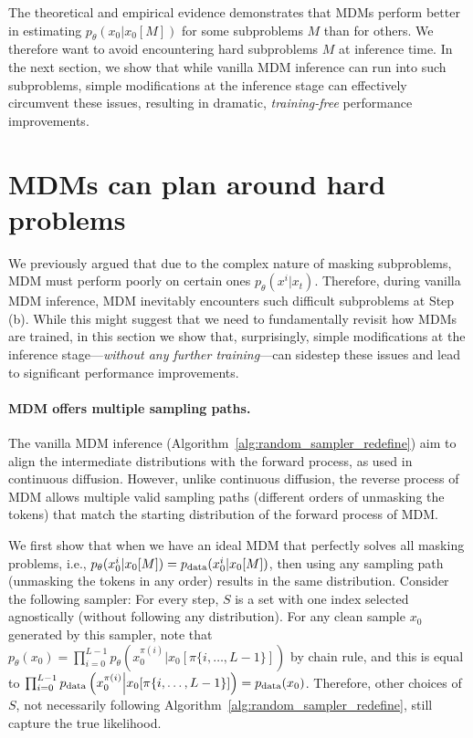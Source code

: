 \documentclass{article}
\theoremstyle{plain}
\theoremstyle{definition}
\theoremstyle{remark}
\newcounter{theo}
\begin{document}
The theoretical and empirical evidence demonstrates that MDMs perform better in estimating $p_{\theta}(x_0 | x_0[M])$ for some subproblems $M$ than for others. We therefore want to avoid encountering hard subproblems $M$ at inference time. In the next section, we show that while vanilla MDM inference can run into such subproblems, simple modifications at the inference stage can effectively circumvent these issues, resulting in dramatic, \emph{training-free} performance improvements.


\section{MDMs can plan around hard problems} \label{sec:inference}
We previously argued that due to the complex nature of masking subproblems, MDM must perform poorly on certain ones $p_\theta(x^i | x_t)$. Therefore, during vanilla MDM inference,
MDM inevitably encounters such difficult subproblems at Step (b). While this might suggest that we need to fundamentally revisit how MDMs are trained, in this section we show that, surprisingly, simple modifications at the inference stage—\emph{without any further training}—can sidestep these issues and lead to significant performance improvements.

\paragraph{MDM offers multiple sampling paths.}
The vanilla MDM inference (Algorithm~\ref{alg:random_sampler_redefine}) aim to align the intermediate distributions with the forward process, as used in continuous diffusion. However, unlike continuous diffusion, the reverse process of MDM allows multiple valid sampling paths (different orders of unmasking the tokens) that match the starting distribution of the forward process of MDM. 

We first show that when we have an ideal MDM that perfectly solves all masking problems, i.e., $p_\theta(x_0^i | x_0[M]) = p_{\rm{data}}(x_0^i | x_0[M])$, then using any sampling path (unmasking the tokens in any order) results in the same distribution. Consider the following sampler: For every step, $S$ is a set with one index selected agnostically (without following any distribution). For any clean sample $x_0$ generated by this sampler, note that $p_\theta(x_0) = \prod_{i=0}^{L-1}  p_\theta \left( x_0^{\pi(i)} \Big| x_0 [\pi\{i,\ldots,L-1\}] \right)$ by chain rule, and this is equal to $\prod_{i=0}^{L-1}  p_{\rm{data}} \left( x_0^{\pi(i)} \Big| x_0 [\pi\{i,\ldots,L-1\}] \right) = p_{\rm{data}}(x_0)$.
Therefore, other choices of $S$, not necessarily following Algorithm~\ref{alg:random_sampler_redefine}, still capture the true likelihood.
\end{document}
